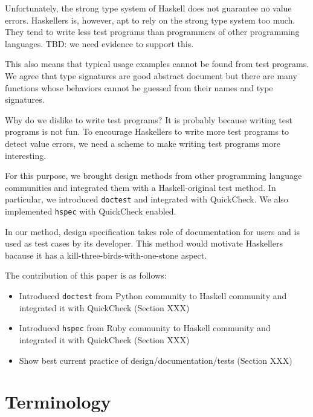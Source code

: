 \documentclass[preprint]{sigplanconf}
\begin{document}
Unfortunately, the strong type system of Haskell does not guarantee
no value errors.
Haskellers is, however, apt to rely on the strong type system too much.
They tend to write less test programs than programmers of other
programming languages. TBD: we need evidence to support this.

This also means that typical usage examples cannot be found from test programs.
We agree that type signatures are good abstract document but
there are many functions whose behaviors cannot be guessed from
their names and type signatures.

Why do we dislike to write test programs?
It is probably because writing test programs is not fun.
To encourage Haskellers to write more test programs
to detect value errors,
we need a scheme to make writing test programs more interesting.

For this purpose,
we brought design methods from other programming language communities and
integrated them with a Haskell-original test method.
In particular, we introduced {\tt doctest} and
integrated with QuickCheck. 
We also implemented {\tt hspec} with QuickCheck enabled.

In our method, design specification takes role of documentation for users and
is used as test cases by its developer. 
This method would motivate Haskellers
bacause it has a kill-three-birds-with-one-stone aspect.



The contribution of this paper is as follows:

\begin{itemize}
\item Introduced {\tt doctest} from Python community to Haskell community
and integrated it with QuickCheck (Section XXX)
\item Introduced {\tt hspec} from Ruby community to Haskell community and
integrated it with QuickCheck (Section XXX)
\item Show best current practice of design/documentation/tests (Section XXX)
\end{itemize}

\section{Terminology}
\end{document}
